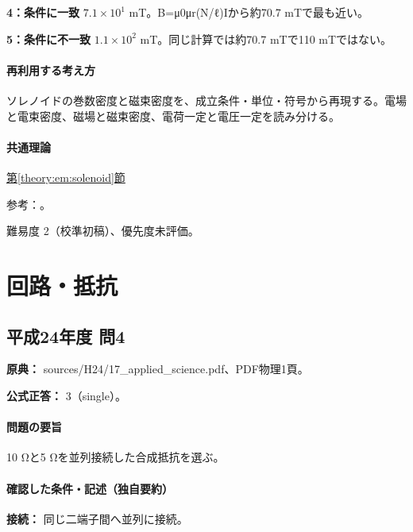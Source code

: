 \noindent\textbf{4：条件に一致} \(7.1\times10^1\) mT。B=μ0μr(N/ℓ)Iから約70.7 mTで最も近い。\par

\noindent\textbf{5：条件に不一致} \(1.1\times10^2\) mT。同じ計算では約70.7 mTで110 mTではない。\par

\paragraph{再利用する考え方} ソレノイドの巻数密度と磁束密度を、成立条件・単位・符号から再現する。電場と電束密度、磁場と磁束密度、電荷一定と電圧一定を読み分ける。

\paragraph{共通理論} \hyperref[theory:em:solenoid]{第\ref*{theory:em:solenoid}節}

\par 参考：\cite{mit_em09}。

\par 難易度 2（校準初稿）、優先度未評価。

\section{回路・抵抗}

\subsection{平成24年度 問4}
\label{q:h24-reg-applied-04}

\noindent\textbf{原典：} sources/H24/17\_applied\_science.pdf、PDF物理1頁。

\textbf{公式正答：} 3（single）。

\paragraph{問題の要旨} 10 Ωと5 Ωを並列接続した合成抵抗を選ぶ。

\paragraph{確認した条件・記述（独自要約）}\mbox{}\par

\noindent\textbf{接続：} 同じ二端子間へ並列に接続。\par


